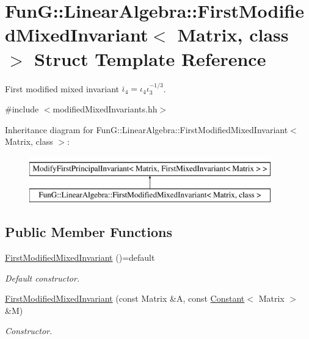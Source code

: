 \hypertarget{structFunG_1_1LinearAlgebra_1_1FirstModifiedMixedInvariant}{\section{Fun\-G\-:\-:Linear\-Algebra\-:\-:First\-Modified\-Mixed\-Invariant$<$ Matrix, class $>$ Struct Template Reference}
\label{structFunG_1_1LinearAlgebra_1_1FirstModifiedMixedInvariant}
}


First modified mixed invariant $\bar\iota_4=\iota_4\iota_3^{-1/3}$.  




{\ttfamily \#include $<$modified\-Mixed\-Invariants.\-hh$>$}

Inheritance diagram for Fun\-G\-:\-:Linear\-Algebra\-:\-:First\-Modified\-Mixed\-Invariant$<$ Matrix, class $>$\-:\begin{figure}[H]
\begin{center}
\leavevmode
\includegraphics[height=2.000000cm]{structFunG_1_1LinearAlgebra_1_1FirstModifiedMixedInvariant}
\end{center}
\end{figure}
\subsection*{Public Member Functions}
\begin{DoxyCompactItemize}
\item 
\hypertarget{structFunG_1_1LinearAlgebra_1_1FirstModifiedMixedInvariant_a8ca742718588da8bf869fe3aa18aaa7d}{\hyperlink{structFunG_1_1LinearAlgebra_1_1FirstModifiedMixedInvariant_a8ca742718588da8bf869fe3aa18aaa7d}{First\-Modified\-Mixed\-Invariant} ()=default}\label{structFunG_1_1LinearAlgebra_1_1FirstModifiedMixedInvariant_a8ca742718588da8bf869fe3aa18aaa7d}

\begin{DoxyCompactList}\small\item\em Default constructor. \end{DoxyCompactList}\item 
\hyperlink{structFunG_1_1LinearAlgebra_1_1FirstModifiedMixedInvariant_a2061f3b57b0576e38d1f9dd19bff798a}{First\-Modified\-Mixed\-Invariant} (const Matrix \&A, const \hyperlink{structFunG_1_1Constant}{Constant}$<$ Matrix $>$ \&M)
\begin{DoxyCompactList}\small\item\em Constructor. \end{DoxyCompactList}\end{DoxyCompactItemize}


